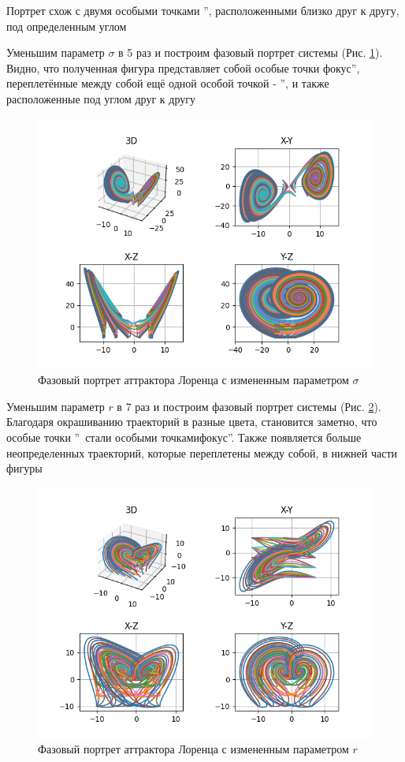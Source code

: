 Портрет схож с двумя особыми точками \textquotedblright, 
расположенными близко друг к другу, под определенным углом

Уменьшим параметр $\sigma$ в 5 раз и построим фазовый портрет системы (Рис. \ref{fig:25}).
Видно, что полученная фигура представляет собой особые точки  фокус\textquotedblright, переплетённые
между собой ещё одной особой точкой - \textquotedblright, и также расположенные под углом друг к другу

\begin{figure}[H]
	\centering
	\includegraphics[width=0.7\linewidth]{body/images/Lorenz-attractor-type-2.png}
	\caption{Фазовый портрет аттрактора Лоренца с измененным параметром $\sigma$}
	\label{fig:25}
\end{figure}

Уменьшим параметр $r$ в 7 раз и построим фазовый портрет системы (Рис. \ref{fig:26}).
Благодаря окрашиванию траекторий в разные цвета, становится заметно, что особые точки \textquotedblright\
стали особыми точками фокус\textquotedblright.
Также появляется больше неопределенных траекторий, которые переплетены между собой, в нижней части фигуры

\begin{figure}[H]
	\centering
	\includegraphics[width=0.6\linewidth]{body/images/Lorenz-attractor-type-3.png}
	\caption{Фазовый портрет аттрактора Лоренца с измененным параметром $r$}
	\label{fig:26}
\end{figure}

